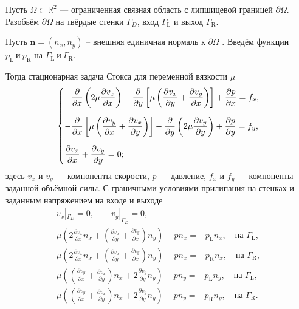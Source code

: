 \documentclass[a4paper,14pt]{extarticle}
\begin{document}
Пусть $\Omega\subset\mathbb R^2$ --- ограниченная связная
область с липшицевой границей $\partial\Omega$.
Разобьём  $\partial\Omega$ на твёрдые стенки $\Gamma_D$,
вход $\Gamma_{\mathrm{L}}$ и выход $\Gamma_{\mathrm{R}}$.


Пусть $\mathbf n = (n_x,n_y)$ -- внешняя единичная нормаль
к $\partial \Omega$ . Введём функции
$
	p_{\mathrm{L}}~\text{и}~p_{\mathrm{R}}
$
на $\Gamma_{\mathrm{L}} ~\text{и}~\Gamma_{\mathrm{R}}$.




Тогда стационарная задача Стокса для переменной вязкости
$\mu$ 
\begin{equation}
	\begin{dcases}
		-\dfrac{\partial}{\partial x}
		\left(
			2\mu\dfrac{\partial v_x}{\partial x}
		\right)
		-
		\dfrac{\partial}{\partial y}
		\left[
			\mu\left(
				\dfrac{\partial v_x}{\partial y}
				+
				\dfrac{\partial v_y}{\partial x}
			\right)
		\right]
		+
		\dfrac{\partial p}{\partial x}
		= f_x, \\[6pt]
		-\dfrac{\partial}{\partial x}
		\left[
			\mu\left(
				\dfrac{\partial v_y}{\partial x}
				+
				\dfrac{\partial v_x}{\partial y}
			\right)
		\right]
		-
		\dfrac{\partial}{\partial y}
		\left(
			2\mu\dfrac{\partial v_y}{\partial y}
		\right)
		+
		\dfrac{\partial p}{\partial y}
		= f_y, \\[6pt]
		\dfrac{\partial v_x}{\partial x}
		+
		\dfrac{\partial v_y}{\partial y}
		= 0;
	\end{dcases}
	\label{eq1}
\end{equation}
здесь $v_x$ и $v_y$ --- компоненты скорости,
$p$ --- давление,  $f_x$ и $f_y$ --- компоненты заданной объёмной силы.
С граничными условиями прилипания на стенках и заданным
напряжением на входе и выходе
\begin{equation}
	\begin{gathered}
		v_x|_{\Gamma_D}=0,
		\qquad
		v_y|_{\Gamma_D}=0,
		\\[6pt]
		\mu\left(
			2\frac{\partial v_x}{\partial x}n_x
			+
			\left(
				\frac{\partial v_x}{\partial y}
				+
				\frac{\partial v_y}{\partial x}
			\right)n_y
		\right)
		-pn_x
		=
		-p_{\mathrm L}n_x,
		\quad \text{на }\Gamma_{\mathrm L},
		\\[6pt]
		\mu\left(
			2\frac{\partial v_x}{\partial x}n_x
			+
			\left(
				\frac{\partial v_x}{\partial y}
				+
				\frac{\partial v_y}{\partial x}
			\right)n_y
		\right)
		-pn_x
		=
		-p_{\mathrm R}n_x,
		\quad \text{на }\Gamma_{\mathrm R},
		\\[6pt]
		\mu\left(
			\left(
				\frac{\partial v_y}{\partial x}
				+
				\frac{\partial v_x}{\partial y}
			\right)n_x
			+
			2\frac{\partial v_y}{\partial y}n_y
		\right)
		-pn_y
		=
		-p_{\mathrm L}n_y,
		\quad \text{на }\Gamma_{\mathrm L},
		\\[6pt]
		\mu\left(
			\left(
				\frac{\partial v_y}{\partial x}
				+
				\frac{\partial v_x}{\partial y}
			\right)n_x
			+
			2\frac{\partial v_y}{\partial y}n_y
		\right)
		-pn_y
		=
		-p_{\mathrm R}n_y,
		\quad \text{на }\Gamma_{\mathrm R}.
	\end{gathered}
\end{equation}
\end{document}
